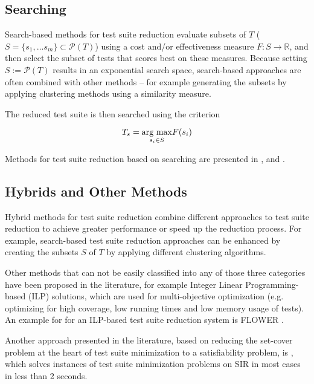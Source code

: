 \subsection{Searching}

Search-based methods for test suite reduction evaluate subsets of $T$
($S=\{s_1, \dots s_m\} \subset \mathcal{P}(T)$) using a cost and/or
effectiveness measure $F: S \rightarrow \mathbb{R}$, and then select
the subset of tests that scores best on these measures. Because
setting $S:=\mathcal{P}(T)$ results in an exponential search space,
search-based approaches are often combined with other methods – for
example generating the subsets by applying clustering methods using a
similarity measure.

The reduced test suite is then searched using the criterion

$$T_s=\underset{s_i \in S}{\hbox{arg max}} F(s_i)$$

Methods for test suite reduction based on searching are presented in
\cite{coutinho2013test}, and \cite{wang2014cost}.

\subsection{Hybrids and Other Methods}

Hybrid methods for test suite reduction combine different approaches
to test suite reduction to achieve greater performance or speed up
the reduction process. For example, search-based test suite reduction
approaches can be enhanced by creating the subsets $S$ of $T$ by applying
different clustering algorithms.

Other methods that can not be easily classified into any of those
three categories have been proposed in the literature, for example
Integer Linear Programming-based (ILP) solutions, which are used for
multi-objective optimization (e.g. optimizing for high coverage, low
running times and low memory usage of tests). An example for for an
ILP-based test suite reduction system is FLOWER \cite{gotlieb2014flower}.

Another approach presented in the literature, based on reducing
the set-cover problem at the heart of test suite minimization
to a satisfiability problem, is \cite{arito2012application},
which solves instances of test suite minimization problems on SIR
\cite{dosupporting2005} in most cases in less than 2 seconds.
